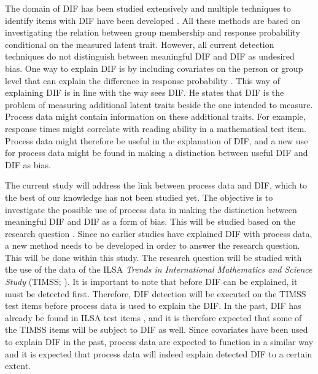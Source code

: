 \documentclass{interact}
\begin{document}
The domain of DIF has been studied extensively \parencite{zumbo1999handbook, zumbo2007three} and multiple techniques to identify items with DIF have been developed \parencite{bechger2015statistical, gao2019comparison, mellenbergh1989item}. All these methods are based on investigating the relation between group membership and response probability conditional on the measured latent trait. However, all current detection techniques do not distinguish between meaningful DIF and DIF as undesired bias. One way to explain DIF is by including covariates on the person or group level that can explain the difference in response probability \parencite{choi2014dif, hagquist2019explaining}. This way of explaining DIF is in line with the way \textcite{ackerman1992didactic} sees DIF. He states that DIF is the problem of measuring additional latent traits beside the one intended to measure. Process data might contain information on these additional traits. For example, response times might correlate with reading ability in a mathematical test item. Process data might therefore be useful in the explanation of DIF, and a new use for process data might be found in making a distinction between useful DIF and DIF as bias.

The current study will address the link between process data and DIF, which to the best of our knowledge has not been studied yet. The objective is to investigate the possible use of process data in making the distinction between meaningful DIF and DIF as a form of bias. This will be studied based on the research question . Since no earlier studies have explained DIF with process data, a new method needs to be developed in order to answer the research question. This will be done within this study. The research question will be studied with the use of the data of the ILSA \textit{Trends in International Mathematics and Science Study} (TIMSS; \cite{TIMSS}). It is important to note that before DIF can be explained, it must be detected first. Therefore, DIF detection will be executed on the TIMSS test items before process data is used to explain the DIF. In the past, DIF has already be found in ILSA test items \parencite{ozdemir2015comparison, choi2014dif, avcsar2021cross, feskens2019differential}, and it is therefore expected that some of the TIMSS items will be subject to DIF as well. Since covariates have been used to explain DIF in the past, process data are expected to function in a similar way and it is expected that process data will indeed explain detected DIF to a certain extent.
\end{document}
